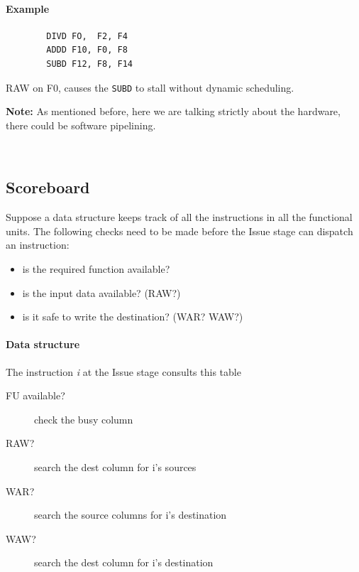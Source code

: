 \paragraph{Example}
\begin{center}
    \begin{verbatim}
        DIVD FO,  F2, F4
        ADDD F10, F0, F8
        SUBD F12, F8, F14
    \end{verbatim}
    \textrightarrow RAW on F0, causes the \verb|SUBD| to stall without dynamic scheduling.

\end{center}

\textbf{Note:} As mentioned before, here we are talking strictly about the hardware, there could be software pipelining.

\

\subsection{Scoreboard}\label{subsec:scoreboard}
Suppose a data structure keeps track of all the instructions in all the functional units.
The following checks need to be made before the Issue stage can dispatch an instruction:
\begin{itemize}
    \item is the required function available?
    \item is the input data available? (RAW?)
    \item is it safe to write the destination? (WAR? WAW?)
\end{itemize}


\paragraph{Data structure} The instruction \textit{i} at the Issue stage consults this table
\begin{description}
    \item[FU available?]
check the busy column
    \item[RAW?]
search the dest column for i’s sources
    \item[WAR?]
search the source columns for i’s destination
    \item[WAW?]
search the dest column for i’s destination
\end{description}

